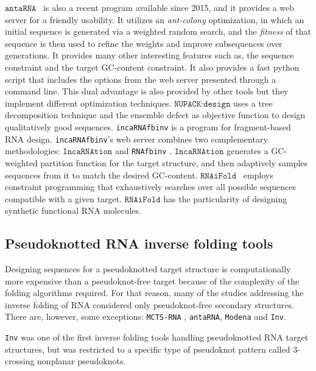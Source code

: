 \(\texttt{antaRNA}\)~\cite{kleinkauf2015antarna} is also a recent program available since 2015, and it provides a web server for a friendly usability. It utilizes an \textit{ant-colony} optimization, in which an initial sequence is generated via a weighted random search, and the \textit{fitness} of that sequence is then used to refine the weights and improve subsequences over generations. It provides many other interesting features such as, the sequence constraint and the target GC-content constraint.  It also provides a fast python script that includes the options from the web server presented through a command line. This dual advantage is also provided by other tools but they implement different optimization techniques. \(\texttt{NUPACK:design}\) \cite{zadeh2011nucleic} uses a tree decomposition technique and the ensemble defect as objective function to design qualitatively good sequences.
\texttt{incaRNAfbinv} \cite{drory2016incarnafbinv} is a program for fragment-based RNA design. \texttt{incaRNAfbinv}'s web server combines two complementary methodologies: \(\texttt{IncaRNAtion}\) \cite{reinharz2013} and \texttt{RNAfbinv} \cite{weinbrand2013rnafbinv}. \(\texttt{IncaRNAtion}\) generates a GC-weighted partition function for the target structure, and then adaptively samples sequences from it to match the desired GC-content. \(\texttt{RNAiFold}\) \cite{garcia2013rnaifold}~employs constraint programming that exhaustively searches over all possible sequences compatible with a given target. \(\texttt{RNAiFold}\) \cite{garcia2013rnaifold} has the particularity of  designing synthetic functional RNA molecules.  


\subsection{Pseudoknotted RNA inverse folding tools}
Designing sequences for a pseudoknotted target structure is computationally more expensive than a pseudoknot-free target because of the complexity of the folding algorithms required. For that reason, many of the studies addressing the inverse folding of RNA considered only pseudoknot-free secondary structures. There are, however, some exceptions: \texttt{MCTS-RNA} \cite{yang2017rna}, \texttt{antaRNA}\cite{kleinkauf2015antarna}, \texttt{Modena} and \texttt{Inv}\cite{gao2010inverse}.
 
 \texttt{Inv} was one of the first inverse folding tools handling pseudoknotted RNA target structures, but was restricted to a specific type of pseudoknot pattern called $3$-crossing nonplanar pseudoknots.
 
